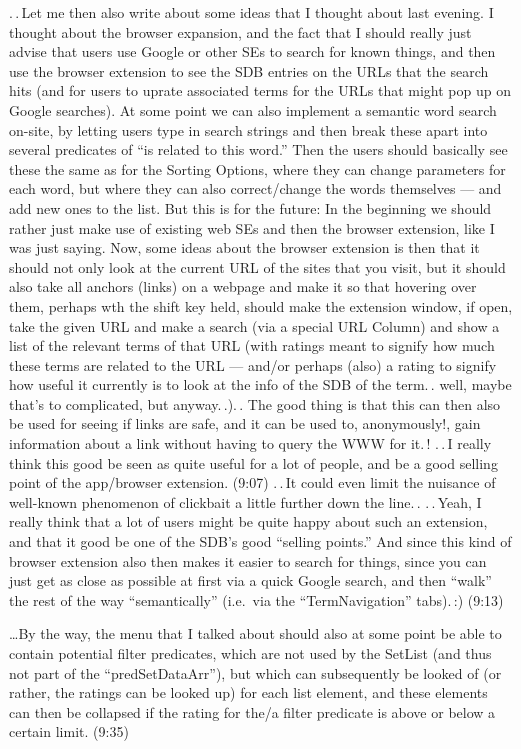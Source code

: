 \documentclass{report}
\begin{document}
.\,.\,Let me then also write about some ideas that I thought about last evening. I thought about the browser expansion, and the fact that I should really just advise that users use Google or other SEs to search for known things, and then use the browser extension to see the SDB entries on the URLs that the search hits (and for users to uprate associated terms for the URLs that might pop up on Google searches). At some point we can also implement a semantic word search on-site, by letting users type in search strings and then break these apart into several predicates of ``is related to this word.'' Then the users should basically see these the same as for the Sorting Options, where they can change parameters for each word, but where they can also correct/change the words themselves --- and add new ones to the list. But this is for the future: In the beginning we should rather just make use of existing web SEs and then the browser extension, like I was just saying. Now, some ideas about the browser extension is then that it should not only look at the current URL of the sites that you visit, but it should also take all anchors (links) on a webpage and make it so that hovering over them, perhaps wth the shift key held, should make the extension window, if open, take the given URL and make a search (via a special URL Column) and show a list of the relevant terms of that URL (with ratings meant to signify how much these terms are related to the URL --- and/or perhaps (also) a rating to signify how useful it currently is to look at the info of the SDB of the term.\,. well, maybe that's to complicated, but anyway.\,.).\,. The good thing is that this can then also be used for seeing if links are safe, and it can be used to, anonymously!, gain information about a link without having to query the WWW for it.\,! .\,.\,I really think this good be seen as quite useful for a lot of people, and be a good selling point of the app/browser extension. (9:07) .\,.\,It could even limit the nuisance of well-known phenomenon of clickbait a little further down the line.\,. .\,.\,Yeah, I really think that a lot of users might be quite happy about such an extension, and that it good be one of the SDB's good ``selling points.'' And since this kind of browser extension also then makes it easier to search for things, since you can just get as close as possible at first via a quick Google search, and then ``walk'' the rest of the way ``semantically'' (i.e.\ via the ``TermNavigation'' tabs).\,:) (9:13) 

\ldots By the way, the menu that I talked about should also at some point be able to contain potential filter predicates, which are not used by the SetList (and thus not part of the ``predSetDataArr''), but which can subsequently be looked of (or rather, the ratings can be looked up) for each list element, and these elements can then be collapsed if the rating for the/a filter predicate is above or below a certain limit. (9:35)
\end{document}

